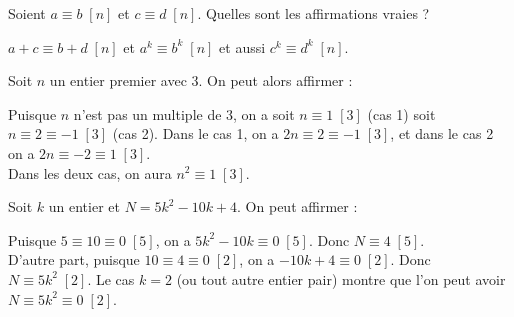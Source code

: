 \begin{question}
    Soient $a\equiv b \;[n]$ et $c \equiv d \; [n]$.
    Quelles sont les affirmations vraies ?
    \begin{answers} 
    \end{answers}
    \begin{explanations} 
     $a+c \equiv b+d \;[n]$ et  $a^k \equiv b^k \;[n]$ et aussi $c^k \equiv d^k \;[n]$.
    \end{explanations}

\end{question}


\begin{question}
 Soit $n$ un entier premier avec $3$. On peut alors affirmer :
    \begin{answers} 
    \end{answers}
    \begin{explanations} 
    Puisque $n$ n'est pas un multiple de $3$, on a soit $n \equiv 1 \;[3]$ (cas 1) soit $n \equiv 2 \equiv -1 \;[3]$ (cas 2). Dans le cas 1, on a $2n \equiv 2 \equiv -1 \;[3]$, et dans le cas 2 on a $2n \equiv -2 \equiv 1 \; [3]$.\\
    Dans les deux cas, on aura $n^2 \equiv 1 \; [3]$.
    \end{explanations}
\end{question}


\begin{question}
    Soit $k$ un entier et $N = 5k^2-10k+4$. On peut affirmer :
    \begin{answers} 
    \end{answers}
    \begin{explanations} 
        Puisque $5 \equiv 10 \equiv 0 \;[5]$, on a $5k^2-10k \equiv 0 \;[5]$. Donc $N \equiv 4 \;[5]$.\\
        D'autre part, puisque $10 \equiv 4 \equiv 0 \;[2]$, on a $-10k+4 \equiv 0 \;[2]$. Donc $N \equiv 5k^2 \;[2]$. Le cas $k=2$ (ou tout autre entier pair) montre que l'on peut avoir $N \equiv 5k^2 \equiv 0 \;[2]$.
    \end{explanations}
\end{question}



